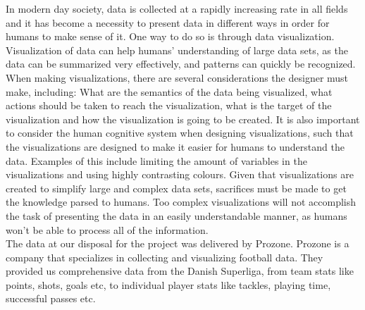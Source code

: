 \documentclass[Report.tex]{subfiles}
\begin{document}
In modern day society, data is collected at a rapidly increasing rate in all fields and it has become a necessity to present data in different ways in order for humans to make sense of it. One way to do so is through data visualization. Visualization of data can help humans' understanding of large data sets, as the data can be summarized very effectively, and patterns can quickly be recognized. When making visualizations, there are several considerations the designer must make, including: What are the semantics of the data being visualized, what actions should be taken to reach the visualization, what is the target of the visualization and how the visualization is going to be created. It is also important to consider the human cognitive system when designing visualizations, such that the visualizations are designed to make it easier for humans to understand the data. Examples of this include limiting the amount of variables in the visualizations and using highly contrasting colours. Given that visualizations are created to simplify large and complex data sets, sacrifices must be made to get the knowledge parsed to humans. Too complex visualizations will not accomplish the task of presenting the data in an easily understandable manner, as humans won’t be able to process all of the information.
\\

The data at our disposal for the project was delivered by Prozone. Prozone is a company that specializes in collecting and visualizing football data. They provided us  comprehensive data from the Danish Superliga, from team stats like points, shots, goals etc, to individual player stats like tackles, playing time, successful passes etc.
\\
\end{document}
